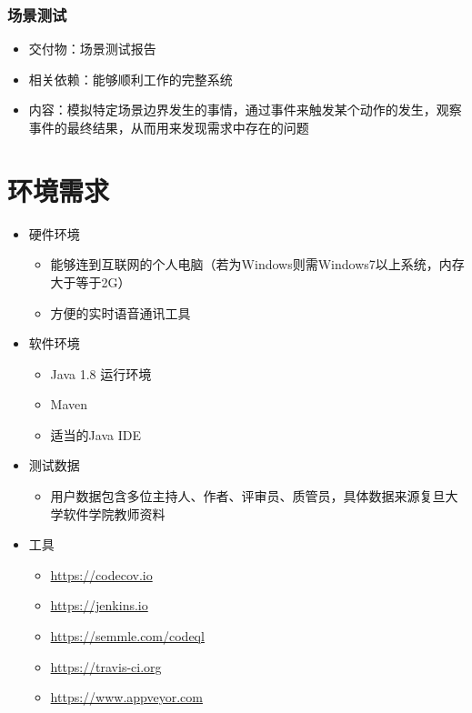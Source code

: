 \documentclass[hyperref, a4paper]{ctexart}
\providecommand{\tightlist}{%
  \setlength{\itemsep}{0pt}\setlength{\parskip}{0pt}}
\begin{document}
\hypertarget{ux573aux666fux6d4bux8bd5}{%
\subsubsection{场景测试}\label{ux573aux666fux6d4bux8bd5}}

\begin{itemize}
\tightlist
\item
  交付物：场景测试报告
\item
  相关依赖：能够顺利工作的完整系统
\item
  内容：模拟特定场景边界发生的事情，通过事件来触发某个动作的发生，观察事件的最终结果，从而用来发现需求中存在的问题
\end{itemize}

\hypertarget{ux73afux5883ux9700ux6c42}{%
\section{环境需求}\label{ux73afux5883ux9700ux6c42}}

\begin{itemize}
\tightlist
\item
  硬件环境

  \begin{itemize}
  \tightlist
  \item
    能够连到互联网的个人电脑（若为Windows则需Windows7以上系统，内存大于等于2G）
  \item
    方便的实时语音通讯工具
  \end{itemize}
\item
  软件环境

  \begin{itemize}
  \tightlist
  \item
    Java 1.8 运行环境
  \item
    Maven
  \item
    适当的Java IDE
  \end{itemize}
\item
  测试数据

  \begin{itemize}
  \tightlist
  \item
    用户数据包含多位主持人、作者、评审员、质管员，具体数据来源复旦大学软件学院教师资料
  \end{itemize}
\item
  工具

  \begin{itemize}
  \tightlist
  \item
    \url{https://codecov.io}
  \item
    \url{https://jenkins.io}
  \item
    \url{https://semmle.com/codeql}
  \item
    \url{https://travis-ci.org}
  \item
    \url{https://www.appveyor.com}
  \end{itemize}
\end{itemize}
\end{document}
